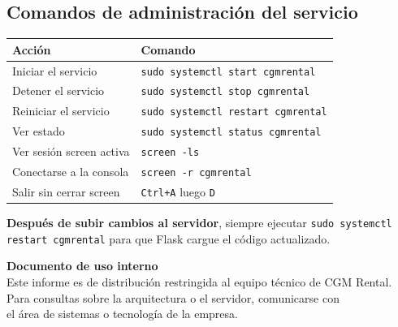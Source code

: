 \documentclass[11pt,a4paper]{article}
\begin{document}
\subsection{Comandos de administración del servicio}

\begin{longtable}{p{7cm} p{7cm}}
\toprule
\textbf{Acción} & \textbf{Comando} \\
\midrule
\endhead
Iniciar el servicio      & \texttt{sudo systemctl start cgmrental} \\
Detener el servicio      & \texttt{sudo systemctl stop cgmrental} \\
Reiniciar el servicio    & \texttt{sudo systemctl restart cgmrental} \\
Ver estado               & \texttt{sudo systemctl status cgmrental} \\
Ver sesión screen activa & \texttt{screen -ls} \\
Conectarse a la consola  & \texttt{screen -r cgmrental} \\
Salir sin cerrar screen  & \texttt{Ctrl+A} luego \texttt{D} \\
\bottomrule
\end{longtable}

\begin{tipbox}
\textbf{Después de subir cambios al servidor}, siempre ejecutar
\texttt{sudo systemctl restart cgmrental} para que Flask cargue el
código actualizado.
\end{tipbox}

\vspace{1cm}
\begin{tcolorbox}[
    colback=cgmgreen,
    colframe=cgmlime,
    boxrule=1pt,
    arc=4pt,
    coltext=white,
    left=14pt, right=14pt, top=12pt, bottom=12pt,
]
\begin{center}
\textbf{\Large Documento de uso interno}\\[0.3cm]
Este informe es de distribución restringida al equipo técnico de CGM Rental.\\[0.2cm]
Para consultas sobre la arquitectura o el servidor, comunicarse con\\
el área de sistemas o tecnología de la empresa.
\end{center}
\end{tcolorbox}
\end{document}
